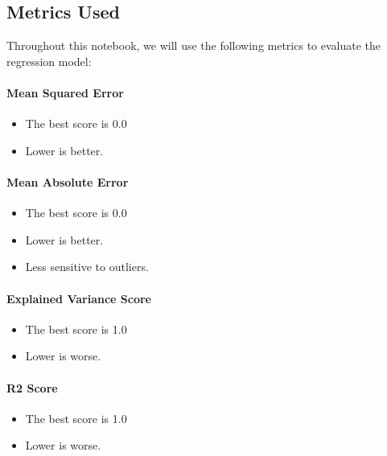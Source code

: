 \documentclass[11pt]{article}
\providecommand{\tightlist}{%
      \setlength{\itemsep}{0pt}\setlength{\parskip}{0pt}}
\begin{document}
    \subsection{Metrics Used}\label{metrics-used}

Throughout this notebook, we will use the following metrics to evaluate
the regression model:

\paragraph{Mean Squared Error}\label{mean-squared-error}

\begin{itemize}
\tightlist
\item
  The best score is 0.0
\item
  Lower is better.
\end{itemize}

\paragraph{Mean Absolute Error}\label{mean-absolute-error}

\begin{itemize}
\tightlist
\item
  The best score is 0.0
\item
  Lower is better.
\item
  Less sensitive to outliers.
\end{itemize}

\paragraph{Explained Variance Score}\label{explained-variance-score}

\begin{itemize}
\tightlist
\item
  The best score is 1.0
\item
  Lower is worse.
\end{itemize}

\paragraph{R2 Score}\label{r2-score}

\begin{itemize}
\tightlist
\item
  The best score is 1.0
\item
  Lower is worse.
\end{itemize}
\end{document}
